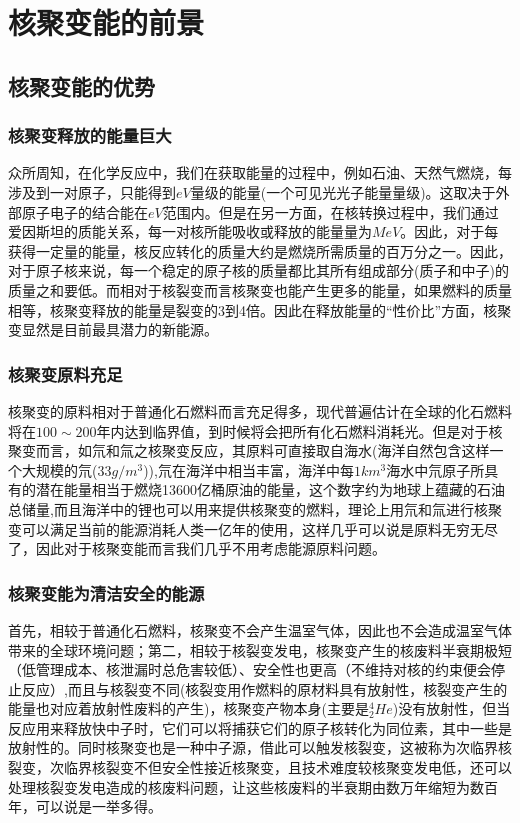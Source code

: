 \chapter{核聚变能的前景}
\section{核聚变能的优势}
\subsection{核聚变释放的能量巨大}
众所周知，在化学反应中，我们在获取能量的过程中，例如石油、天然气燃烧，每涉及到一对原子，只能得到$eV$量级的能量(一个可见光光子能量量级)。这取决于外部原子电子的结合能在$eV$范围内。但是在另一方面，在核转换过程中，我们通过爱因斯坦的质能关系，每一对核所能吸收或释放的能量量为$MeV$。因此，对于每获得一定量的能量，核反应转化的质量大约是燃烧所需质量的百万分之一。因此，对于原子核来说，每一个稳定的原子核的质量都比其所有组成部分(质子和中子)的质量之和要低\cite{Focardi2010ANE}。而相对于核裂变而言核聚变也能产生更多的能量，如果燃料的质量相等，核聚变释放的能量是裂变的3到4倍\cite{Petrescu2017SomePS}。因此在释放能量的“性价比”方面，核聚变显然是目前最具潜力的新能源。
\subsection{核聚变原料充足}
核聚变的原料相对于普通化石燃料而言充足得多，现代普遍估计在全球的化石燃料将在$100\sim 200$年内达到临界值，到时候将会把所有化石燃料消耗光。但是对于核聚变而言，如氘和氚之核聚变反应，其原料可直接取自海水(海洋自然包含这样一个大规模的氘($33g/m^{3}$)),氘在海洋中相当丰富，海洋中每$1km^{3}$海水中氘原子所具有的潜在能量相当于燃烧13600亿桶原油的能量，这个数字约为地球上蕴藏的石油总储量,而且海洋中的锂也可以用来提供核聚变的燃料，理论上用氘和氚进行核聚变可以满足当前的能源消耗人类一亿年的使用，这样几乎可以说是原料无穷无尽了，因此对于核聚变能而言我们几乎不用考虑能源原料问题。
\subsection{核聚变能为清洁安全的能源}
首先，相较于普通化石燃料，核聚变不会产生温室气体，因此也不会造成温室气体带来的全球环境问题；第二，相较于核裂变发电，核聚变产生的核废料半衰期极短（低管理成本、核泄漏时总危害较低）、安全性也更高（不维持对核的约束便会停止反应）,而且与核裂变不同(核裂变用作燃料的原材料具有放射性，核裂变产生的能量也对应着放射性废料的产生)，核聚变产物本身(主要是$_{2}^{4}He$)没有放射性，但当反应用来释放快中子时，它们可以将捕获它们的原子核转化为同位素，其中一些是放射性的。同时核聚变也是一种中子源，借此可以触发核裂变，这被称为次临界核裂变，次临界核裂变不但安全性接近核聚变，且技术难度较核聚变发电低，还可以处理核裂变发电造成的核废料问题，让这些核废料的半衰期由数万年缩短为数百年，可以说是一举多得。
